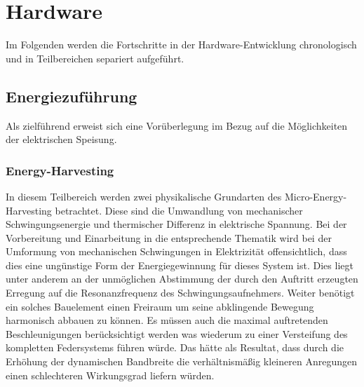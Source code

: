 \documentclass[11pt]{scrreprt} %
\begin{document}
\chapter{Hardware}
Im Folgenden werden die Fortschritte in der Hardware-Entwicklung chronologisch und in Teilbereichen separiert aufgeführt.
\section{Energiezuführung}
Als zielführend erweist sich eine Vorüberlegung im Bezug auf die Möglichkeiten der elektrischen Speisung.
\subsection{Energy-Harvesting}
In diesem Teilbereich werden zwei physikalische Grundarten des Micro-Energy-Harvesting betrachtet. Diese sind die Umwandlung von mechanischer Schwingungsenergie und thermischer Differenz in elektrische Spannung. Bei der Vorbereitung und Einarbeitung in die entsprechende Thematik wird bei der Umformung von mechanischen Schwingungen in Elektrizität offensichtlich, dass dies eine ungünstige Form der Energiegewinnung für dieses System ist. Dies liegt unter anderem an der unmöglichen Abstimmung der durch den Auftritt erzeugten Erregung auf die Resonanzfrequenz des Schwingungsaufnehmers. Weiter benötigt ein solches Bauelement einen Freiraum um seine abklingende Bewegung harmonisch abbauen zu können. Es müssen auch die maximal auftretenden Beschleunigungen berücksichtigt werden was wiederum zu einer Versteifung des kompletten Federsystems führen würde. Das hätte als Resultat, dass durch die Erhöhung der dynamischen Bandbreite die verhältnismäßig kleineren Anregungen einen schlechteren Wirkungsgrad liefern würden. 
\end{document}
